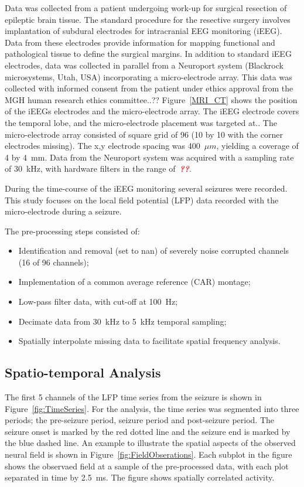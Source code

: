\documentclass[]{article}
\newcommand{\dean}[1]{\textsf{\emph{\textbf{\textcolor{red}{#1}}}}}
\begin{document}
Data was collected from a patient undergoing work-up for surgical resection of epileptic brain tissue. The standard procedure for the resective surgery involves implantation of subdural electrodes for intracranial EEG monitoring (iEEG). Data from these electrodes provide information for mapping functional and pathological tissue to define the surgical margins. In addition to standard iEEG electrodes, data was collected in parallel from a Neuroport system (Blackrock microsystems, Utah, USA) incorporating a micro-electrode array. This data was collected with informed consent from the patient under ethics approval from the MGH human research ethics committee..?? Figure~\ref{MRI_CT} shows the position of the iEEGs electrodes and the micro-electrode array. The iEEG electrode covers the temporal lobe, and the micro-electrode placement was targeted at.. The micro-electrode array consisted of square grid of 96 (10 by 10 with the corner electrodes missing). The x,y electrode spacing was 400~$\mu m$, yielding a coverage of 4 by 4~mm. Data from the Neuroport system was acquired with a sampling rate of 30~kHz, with hardware filters in the range of~\dean{??}. 

During the time-course of the iEEG monitoring several seizures were recorded. This study focuses on the local field potential (LFP) data recorded with the micro-electrode during a seizure. 

The pre-processing steps consisted of:
\begin{itemize}
	\item Identification and removal (set to nan) of severely noise corrupted channels (16 of 96 channels);
	\item Implementation of a common average reference (CAR) montage; 
	\item Low-pass filter data, with cut-off at 100~Hz;
	\item Decimate data from 30~kHz to 5~kHz temporal sampling;
	\item Spatially interpolate missing data to facilitate spatial frequency analysis.
\end{itemize}

\subsection{Spatio-temporal Analysis}
The first 5 channels of the LFP time series from the seizure is shown in Figure~\ref{fig:TimeSeries}. For the analysis, the time series was segmented into three periods; the pre-seizure period, seizure period and post-seizure period. The seizure onset is marked by the red dotted line and the seizure end is marked by the blue dashed line. An example to illustrate the spatial aspects of the observed neural field is shown in Figure~\ref{fig:FieldObserations}. Each subplot in the figure shows the observaed field at a sample of the pre-processed data, with each plot separated in time by 2.5~ms. The figure shows spatially correlated activity.
\end{document}
